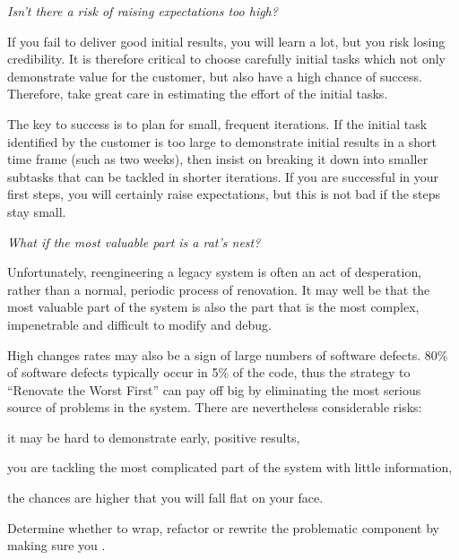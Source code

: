 \documentclass[a4paper,10pt,twoside]{book}
\begin{document}
\emph{Isn't there a risk of raising expectations too high?}

\begin{bulletlist}
  \item If you fail to deliver good initial results, you will learn a lot, but you risk losing credibility. It is therefore critical to choose carefully initial tasks which not only demonstrate value for the customer, but also have a high chance of success. Therefore, take great care in estimating the effort of the initial tasks.

  \item The key to success is to plan for small, frequent iterations. If the initial task identified by the customer is too large to demonstrate initial results in a short time frame (such as two weeks), then insist on breaking it down into smaller subtasks that can be tackled in shorter iterations. If you are successful in your first steps, you will certainly raise expectations, but this is not bad if the steps stay small.

\end{bulletlist}

\emph{What if the most valuable part is a rat's nest?}

\begin{bulletlist}
  \item Unfortunately, reengineering a legacy system is often an act of desperation, rather than a normal, periodic process of renovation. It may well be that the most valuable part of the system is also the part that is the most complex, impenetrable and difficult to modify and debug. 

  \item High changes rates may also be a sign of large numbers of software defects. 80\% of software defects typically occur in 5\% of the code, thus the strategy to ``Renovate the Worst First'' \cite{Davi95a} can pay off big by eliminating the most serious source of problems in the system. There are nevertheless considerable risks:

	\begin{bulletlist}
	  \item 	it may be hard to demonstrate early, positive results,

	  \item 	you are tackling the most complicated part of the system with little information,

	  \item 	the chances are higher that you will fall flat on your face.

	\end{bulletlist}

  \item Determine whether to wrap, refactor or rewrite the problematic component by making sure you .

\end{bulletlist}
\end{document}
